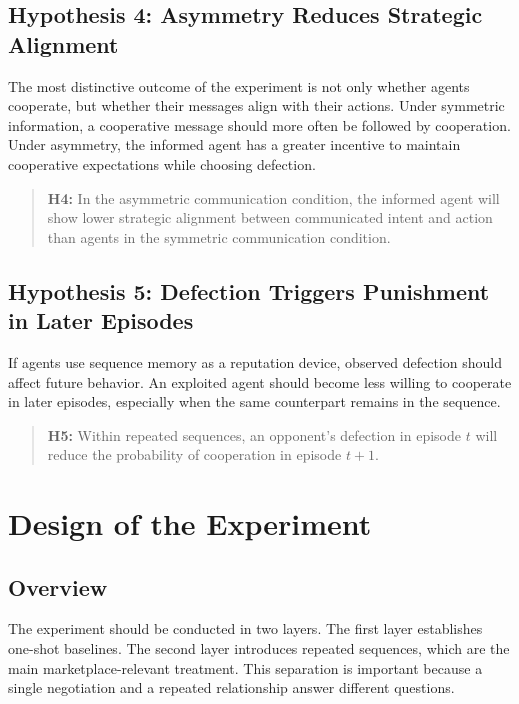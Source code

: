 \documentclass[12pt,a4paper]{article}
\begin{document}
\subsection{Hypothesis 4: Asymmetry Reduces Strategic Alignment}

The most distinctive outcome of the experiment is not only whether agents cooperate, but whether their messages align with their actions. Under symmetric information, a cooperative message should more often be followed by cooperation. Under asymmetry, the informed agent has a greater incentive to maintain cooperative expectations while choosing defection.

\begin{quote}
\textbf{H4:} In the asymmetric communication condition, the informed agent will show lower strategic alignment between communicated intent and action than agents in the symmetric communication condition.
\end{quote}

\subsection{Hypothesis 5: Defection Triggers Punishment in Later Episodes}

If agents use sequence memory as a reputation device, observed defection should affect future behavior. An exploited agent should become less willing to cooperate in later episodes, especially when the same counterpart remains in the sequence.

\begin{quote}
\textbf{H5:} Within repeated sequences, an opponent's defection in episode $t$ will reduce the probability of cooperation in episode $t+1$.
\end{quote}


\section{Design of the Experiment}

\subsection{Overview}

The experiment should be conducted in two layers. The first layer establishes one-shot baselines. The second layer introduces repeated sequences, which are the main marketplace-relevant treatment. This separation is important because a single negotiation and a repeated relationship answer different questions.
\end{document}
